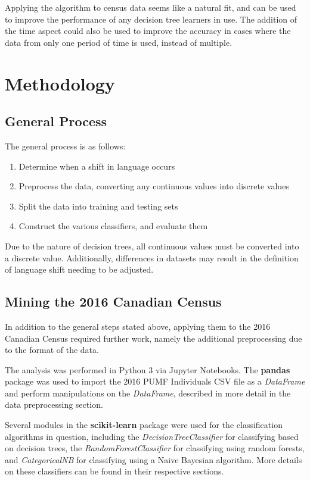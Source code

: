 \documentclass[10pt, conference, compsocconf]{IEEEtran}
\begin{document}
Applying the algorithm to census data seems like a natural fit, and can be used to improve the performance of any decision tree learners in use. The addition of the time aspect could also be used to improve the accuracy in cases where the data from only one period of time is used, instead of multiple.


\section{Methodology}

\subsection{General Process}
The general process is as follows:
\begin{enumerate}
	\item Determine when a shift in language occurs
	\item Preprocess the data, converting any continuous values into discrete values
	\item Split the data into training and testing sets
	\item Construct the various classifiers, and evaluate them
\end{enumerate}

Due to the nature of decision trees, all continuous values must be converted into a discrete value. Additionally, differences in datasets may result in the definition of language shift needing to be adjusted.

\subsection{Mining the 2016 Canadian Census}
In addition to the general steps stated above, applying them to the 2016 Canadian Census required further work, namely the additional preprocessing due to the format of the data.

The analysis was performed in Python 3 via Jupyter Notebooks.  
The \textbf{pandas} package was used to import the 2016 PUMF Individuals CSV file as a \textit{DataFrame} and perform manipulations on the \textit{DataFrame}, described in more detail in the data preprocessing section.

Several modules in the \textbf{scikit-learn} package were used for the classification algorithms in question, including the \textit{DecisionTreeClassifier} for classifying based on decision trees, the \textit{RandomForestClassifier} for classifying using random forests, and \textit{CategoricalNB} for classifying using a Naive Bayesian algorithm. More details on these classifiers can be found in their respective sections.
\end{document}

